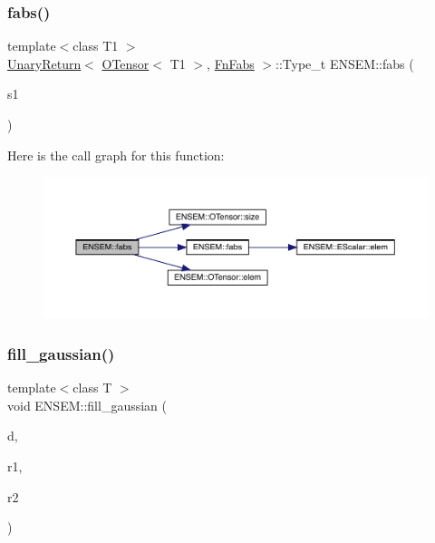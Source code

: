 \subsubsection{\texorpdfstring{fabs()}{fabs()}}
{\footnotesize\ttfamily template$<$class T1 $>$ \\
\mbox{\hyperlink{structENSEM_1_1UnaryReturn}{Unary\+Return}}$<$ \mbox{\hyperlink{classENSEM_1_1OTensor}{O\+Tensor}}$<$ T1 $>$, \mbox{\hyperlink{structENSEM_1_1FnFabs}{Fn\+Fabs}} $>$\+::Type\+\_\+t E\+N\+S\+E\+M\+::fabs (\begin{DoxyParamCaption}\item[{const \mbox{\hyperlink{classENSEM_1_1OTensor}{O\+Tensor}}$<$ T1 $>$ \&}]{s1 }\end{DoxyParamCaption})\hspace{0.3cm}{\ttfamily [inline]}}

Here is the call graph for this function\+:\nopagebreak
\begin{figure}[H]
\begin{center}
\leavevmode
\includegraphics[width=350pt]{de/d87/group__obstensor_ga246cc858f35ed63a911bfa33abd22d98_cgraph}
\end{center}
\end{figure}
\mbox{\label{group__obstensor_ga5461ae19cc6cfc4271fe13264bbda77d}} 
\subsubsection{\texorpdfstring{fill\_gaussian()}{fill\_gaussian()}}
{\footnotesize\ttfamily template$<$class T $>$ \\
void E\+N\+S\+E\+M\+::fill\+\_\+gaussian (\begin{DoxyParamCaption}\item[{\mbox{\hyperlink{classENSEM_1_1OTensor}{O\+Tensor}}$<$ T $>$ \&}]{d,  }\item[{\mbox{\hyperlink{classENSEM_1_1OTensor}{O\+Tensor}}$<$ T $>$ \&}]{r1,  }\item[{\mbox{\hyperlink{classENSEM_1_1OTensor}{O\+Tensor}}$<$ T $>$ \&}]{r2 }\end{DoxyParamCaption})\hspace{0.3cm}{\ttfamily [inline]}}



